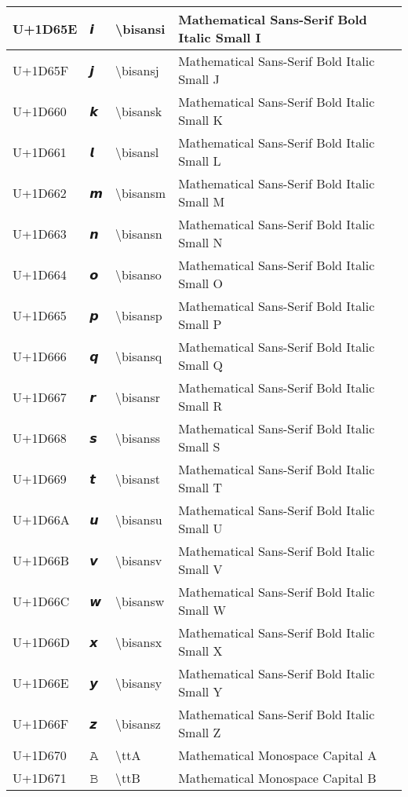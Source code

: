 \begin{table}[h]
\begin{tabulary}{\linewidth}{|L|L|L|L|}
\hline
U+1D65E & 𝙞 & {\textbackslash}bisansi & Mathematical Sans-Serif Bold Italic Small I \\
\hline
U+1D65F & 𝙟 & {\textbackslash}bisansj & Mathematical Sans-Serif Bold Italic Small J \\
\hline
U+1D660 & 𝙠 & {\textbackslash}bisansk & Mathematical Sans-Serif Bold Italic Small K \\
\hline
U+1D661 & 𝙡 & {\textbackslash}bisansl & Mathematical Sans-Serif Bold Italic Small L \\
\hline
U+1D662 & 𝙢 & {\textbackslash}bisansm & Mathematical Sans-Serif Bold Italic Small M \\
\hline
U+1D663 & 𝙣 & {\textbackslash}bisansn & Mathematical Sans-Serif Bold Italic Small N \\
\hline
U+1D664 & 𝙤 & {\textbackslash}bisanso & Mathematical Sans-Serif Bold Italic Small O \\
\hline
U+1D665 & 𝙥 & {\textbackslash}bisansp & Mathematical Sans-Serif Bold Italic Small P \\
\hline
U+1D666 & 𝙦 & {\textbackslash}bisansq & Mathematical Sans-Serif Bold Italic Small Q \\
\hline
U+1D667 & 𝙧 & {\textbackslash}bisansr & Mathematical Sans-Serif Bold Italic Small R \\
\hline
U+1D668 & 𝙨 & {\textbackslash}bisanss & Mathematical Sans-Serif Bold Italic Small S \\
\hline
U+1D669 & 𝙩 & {\textbackslash}bisanst & Mathematical Sans-Serif Bold Italic Small T \\
\hline
U+1D66A & 𝙪 & {\textbackslash}bisansu & Mathematical Sans-Serif Bold Italic Small U \\
\hline
U+1D66B & 𝙫 & {\textbackslash}bisansv & Mathematical Sans-Serif Bold Italic Small V \\
\hline
U+1D66C & 𝙬 & {\textbackslash}bisansw & Mathematical Sans-Serif Bold Italic Small W \\
\hline
U+1D66D & 𝙭 & {\textbackslash}bisansx & Mathematical Sans-Serif Bold Italic Small X \\
\hline
U+1D66E & 𝙮 & {\textbackslash}bisansy & Mathematical Sans-Serif Bold Italic Small Y \\
\hline
U+1D66F & 𝙯 & {\textbackslash}bisansz & Mathematical Sans-Serif Bold Italic Small Z \\
\hline
U+1D670 & 𝙰 & {\textbackslash}ttA & Mathematical Monospace Capital A \\
\hline
U+1D671 & 𝙱 & {\textbackslash}ttB & Mathematical Monospace Capital B \\

\end{tabulary}
\end{table}
